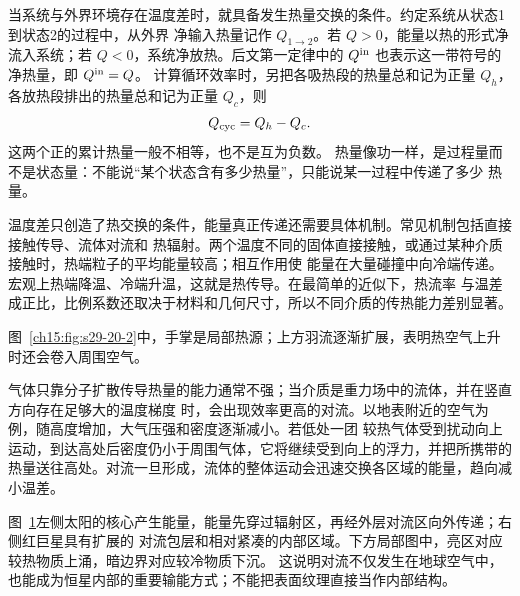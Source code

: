 {当系统与外界环境存在温度差时，就具备发生热量交换的条件。约定系统从状态1到状态2的过程中，从外界
净输入热量记作 $Q_{1\to2}$。若 $Q>0$，能量以热的形式净流入系统；若
$Q<0$，系统净放热。后文第一定律中的 $Q^{\rm in}$ 也表示这一带符号的净热量，即 $Q^{\rm in}=Q$。
计算循环效率时，另把各吸热段的热量总和记为正量 $Q_h$，各放热段排出的热量总和记为正量 $Q_c$，则
\begin{equation*}
  Q_{\rm cyc}=Q_h-Q_c.
\end{equation*}
这两个正的累计热量一般不相等，也不是互为负数。
热量像功一样，是过程量而不是状态量：不能说“某个状态含有多少热量”，只能说某一过程中传递了多少
热量。

温度差只创造了热交换的条件，能量真正传递还需要具体机制。常见机制包括直接接触传导、流体对流和
热辐射。两个温度不同的固体直接接触，或通过某种介质接触时，热端粒子的平均能量较高；相互作用使
能量在大量碰撞中向冷端传递。宏观上热端降温、冷端升温，这就是热传导。在最简单的近似下，热流率
与温差成正比，比例系数还取决于材料和几何尺寸，所以不同介质的传热能力差别显著。

\par\noindent\begin{minipage}{\linewidth}
\label{ch15:fig:s29-20-2}
\end{minipage}\par\medskip
图~\ref{ch15:fig:s29-20-2}中，手掌是局部热源；上方羽流逐渐扩展，表明热空气上升时还会卷入周围空气。

气体只靠分子扩散传导热量的能力通常不强；当介质是重力场中的流体，并在竖直方向存在足够大的温度梯度
时，会出现效率更高的对流。以地表附近的空气为例，随高度增加，大气压强和密度逐渐减小。若低处一团
较热气体受到扰动向上运动，到达高处后密度仍小于周围气体，它将继续受到向上的浮力，并把所携带的
热量送往高处。对流一旦形成，流体的整体运动会迅速交换各区域的能量，趋向减小温差。

\begin{figure}[!t]
\centering
\stellarInteriorRevision
{}\label{ch15:fig:s29-20-3}
\end{figure}
图~\ref{ch15:fig:s29-20-3}左侧太阳的核心产生能量，能量先穿过辐射区，再经外层对流区向外传递；右侧红巨星具有扩展的
对流包层和相对紧凑的内部区域。下方局部图中，亮区对应较热物质上涌，暗边界对应较冷物质下沉。
这说明对流不仅发生在地球空气中，也能成为恒星内部的重要输能方式；不能把表面纹理直接当作内部结构。

}
